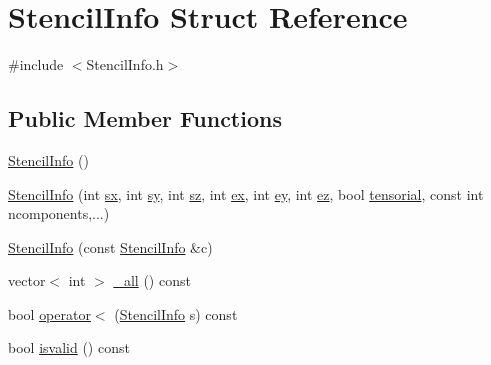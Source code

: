 \hypertarget{struct_stencil_info}{}\section{Stencil\+Info Struct Reference}
\label{struct_stencil_info}


{\ttfamily \#include $<$Stencil\+Info.\+h$>$}

\subsection*{Public Member Functions}
\begin{DoxyCompactItemize}
\item 
\hyperlink{struct_stencil_info_aa57db7db48af43afe4aea2d8193e4929}{Stencil\+Info} ()
\item 
\hyperlink{struct_stencil_info_a425ff6e57504e2a3ff457313c81c0280}{Stencil\+Info} (int \hyperlink{struct_stencil_info_acbfb2d23b2b10177dd846173a299b847}{sx}, int \hyperlink{struct_stencil_info_a4f024cdf41fca32720321fa95bd2a8bd}{sy}, int \hyperlink{struct_stencil_info_a00e8cbf611bbb74ad861a6d74b6d0d9f}{sz}, int \hyperlink{struct_stencil_info_a5eddf6f1b64ce03fc84e6e447e4d500f}{ex}, int \hyperlink{struct_stencil_info_a584955f3761b5854a9050c97cba3c3ca}{ey}, int \hyperlink{struct_stencil_info_afbdda2df54c6af8e9e8b8536e6e31bdc}{ez}, bool \hyperlink{struct_stencil_info_ab3fce74853afec119eee90a6274d1559}{tensorial}, const int ncomponents,...)
\item 
\hyperlink{struct_stencil_info_a2a83508eacc5f8c6137291f742aa3a54}{Stencil\+Info} (const \hyperlink{struct_stencil_info}{Stencil\+Info} \&c)
\item 
vector$<$ int $>$ \hyperlink{struct_stencil_info_aeab810410413b373298ea516985311ea}{\+\_\+all} () const 
\item 
bool \hyperlink{struct_stencil_info_aeea068217994c4d9ace5d0ddfa19741f}{operator$<$} (\hyperlink{struct_stencil_info}{Stencil\+Info} s) const 
\item 
bool \hyperlink{struct_stencil_info_ade52d43b224cc671c6082237e699f9e7}{isvalid} () const 
\end{DoxyCompactItemize}
